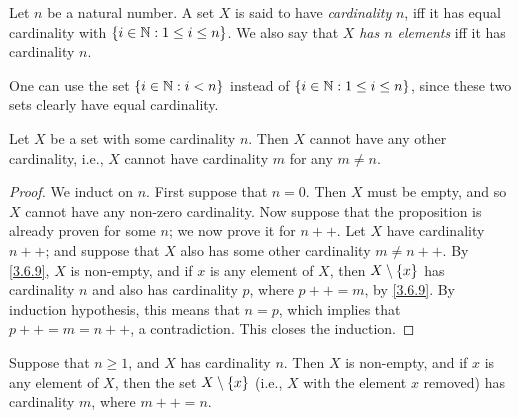 \begin{defn}\label{3.6.5}
	Let \(n\) be a natural number.
	A set \(X\) is said to have \emph{cardinality} \(n\), iff it has equal cardinality with \(\left\lbrace i \in \mathbb{N} : 1 \leq i \leq n\right\rbrace\).
	We also say that \(X\) \emph{has \(n\) elements} iff it has cardinality \(n\).
\end{defn}

\begin{rmk}\label{3.6.6}
	One can use the set \(\left\lbrace i \in \mathbb{N} : i < n\right\rbrace\) instead of \(\left\lbrace i \in \mathbb{N} : 1 \leq i \leq n\right\rbrace\), since these two sets clearly have equal cardinality.
\end{rmk}

\setcounter{thm}{7}
\begin{prop}\label{3.6.8}
	Let \(X\) be a set with some cardinality \(n\).
	Then \(X\) cannot have any other cardinality, i.e., \(X\) cannot have cardinality \(m\) for any \(m \neq n\).
\end{prop}

\begin{proof}
	We induct on \(n\).
	First suppose that \(n = 0\).
	Then \(X\) must be empty, and so \(X\) cannot have any non-zero cardinality.
	Now suppose that the proposition is already proven for some \(n\);
	we now prove it for \(n++\).
	Let \(X\) have cardinality \(n++\);
	and suppose that \(X\) also has some other cardinality \(m \neq n++\).
	By \cref{3.6.9}, \(X\) is non-empty, and if \(x\) is any element of \(X\), then \(X \setminus \left\lbrace x\right\rbrace\) has cardinality \(n\) and also has cardinality \(p\), where \(p++ = m\), by \cref{3.6.9}.
	By induction hypothesis, this means that \(n = p\), which implies that \(p++ = m = n++\), a contradiction.
	This closes the induction.
\end{proof}

\begin{lem}\label{3.6.9}
	Suppose that \(n \geq 1\), and \(X\) has cardinality \(n\).
	Then \(X\) is non-empty, and if \(x\) is any element of \(X\), then the set \(X \setminus \left\lbrace x\right\rbrace\) (i.e., \(X\) with the element \(x\) removed) has cardinality \(m\), where \(m++ = n\).
\end{lem}

